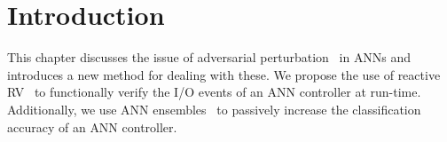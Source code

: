 \section{Introduction}
This chapter discusses the issue of adversarial perturbation~\cite{Gehr2018AI2SA} in \acfp{ANN} and introduces a new method for dealing with these.
We propose the use of reactive \acf{RV}~\cite{runtime-verify} to functionally verify the I/O events of an \ac{ANN} controller at run-time.
Additionally, we use \ac{ANN} ensembles~\cite{Maqsood2004} to passively increase the classification accuracy of an \ac{ANN} controller.















